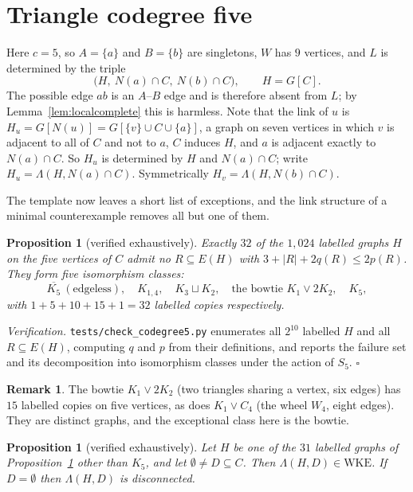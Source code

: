 \documentclass[11pt,a4paper]{amsart}
\theoremstyle{plain}
\newtheorem{proposition}[theorem]{Proposition}
\theoremstyle{definition}
\newtheorem{remark}[theorem]{Remark}
\newcommand{\WKE}{\mathrm{WKE}}
\newcommand{\N}{N}
\begin{document}
\section{Triangle codegree five}\label{sec:codeg5}

Here $c=5$, so $A=\{a\}$ and $B=\{b\}$ are singletons, $W$ has $9$ vertices,
and $L$ is determined by the triple
\[
  \bigl(H,\ \N(a)\cap C,\ \N(b)\cap C\bigr),\qquad H=G[C].
\]
The possible edge $ab$ is an $A$--$B$ edge and is therefore absent from $L$;
by Lemma~\ref{lem:localcomplete} this is harmless. Note that the link of $u$ is
$H_u=G[\N(u)]=G[\{v\}\cup C\cup\{a\}]$, a graph on seven vertices in which
$v$ is adjacent to all of $C$ and not to $a$, $C$ induces $H$, and $a$ is
adjacent exactly to $\N(a)\cap C$. So $H_u$ is determined by $H$ and
$\N(a)\cap C$; write $H_u=\Lambda(H,\N(a)\cap C)$. Symmetrically
$H_v=\Lambda(H,\N(b)\cap C)$.

The template now leaves a short list of exceptions, and the link structure of
a minimal counterexample removes all but one of them.

\begin{proposition}[verified exhaustively]\label{prop:template5}
Exactly $32$ of the $1{,}024$ labelled graphs $H$ on the five vertices of $C$
admit no $R\subseteq E(H)$ with $3+|R|+2q(R)\le 2p(R)$. They form five
isomorphism classes:
\[
  \overline{K_5}\ (\text{edgeless}),\quad K_{1,4},\quad K_3\sqcup K_2,\quad
  \text{the bowtie } K_1\vee 2K_2,\quad K_5,
\]
with $1+5+10+15+1=32$ labelled copies respectively.
\end{proposition}

\emph{Verification.} \texttt{tests/check\_codegree5.py} enumerates all $2^{10}$
labelled $H$ and all $R\subseteq E(H)$, computing $q$ and $p$ from their
definitions, and reports the failure set and its decomposition into
isomorphism classes under the action of $S_5$. \hfill$\square$

\begin{remark}
The bowtie $K_1\vee 2K_2$ (two triangles sharing a vertex, six edges) has $15$
labelled copies on five vertices, as does $K_1\vee C_4$ (the wheel $W_4$,
eight edges). They are distinct graphs, and the exceptional class here is the
bowtie.
\end{remark}

\begin{proposition}[verified exhaustively]\label{prop:exceptional5}
Let $H$ be one of the $31$ labelled graphs of Proposition~\ref{prop:template5}
other than $K_5$, and let $\emptyset\ne D\subseteq C$. Then
$\Lambda(H,D)\in\WKE$. If $D=\emptyset$ then $\Lambda(H,D)$ is disconnected.
\end{proposition}
\end{document}
